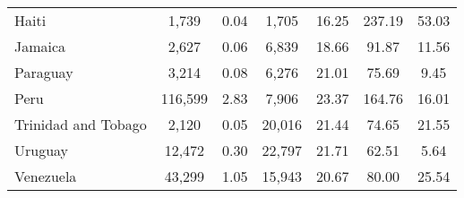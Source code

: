 \begin{table}[ht]
\begin{tabular}{l|cccccc}
  Haiti & 1,739 & 0.04 & 1,705 & 16.25 & 237.19 & 53.03 \\ 
  Jamaica & 2,627 & 0.06 & 6,839 & 18.66 & 91.87 & 11.56 \\ 
  Paraguay & 3,214 & 0.08 & 6,276 & 21.01 & 75.69 & 9.45 \\ 
  Peru & 116,599 & 2.83 & 7,906 & 23.37 & 164.76 & 16.01 \\ 
  Trinidad and Tobago & 2,120 & 0.05 & 20,016 & 21.44 & 74.65 & 21.55 \\ 
  Uruguay & 12,472 & 0.30 & 22,797 & 21.71 & 62.51 & 5.64 \\ 
  Venezuela & 43,299 & 1.05 & 15,943 & 20.67 & 80.00 & 25.54 \\ 
   \hline
\end{tabular}
\end{table}
